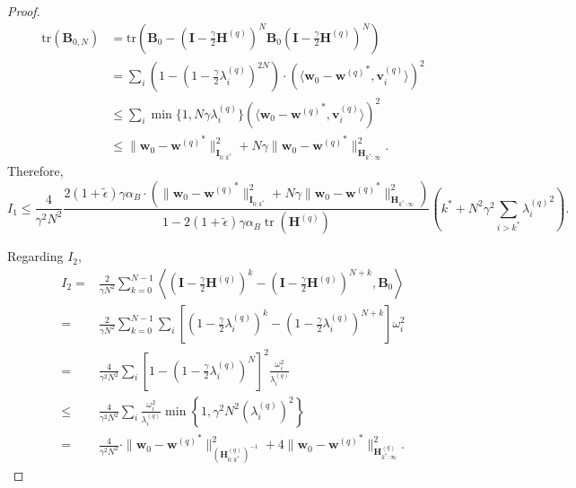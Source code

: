 \documentclass[11pt, letterpaper]{article}
\begin{document}
\begin{proof}
\begin{equation}
        \begin{aligned}
            \mathrm{tr}(\mathbf{B}_{0,N})&=\mathrm{tr}\left(\mathbf{B}_{0}-(\mathbf{I}-\frac{\gamma}{2}\mathbf{H}^{(q)})^{N}\mathbf{B}_{0}(\mathbf{I}-\frac{\gamma}{2}\mathbf{H}^{(q)})^{N}\right)\\
            &=\sum_{i}\left(1-(1-\frac{\gamma}{2}\lambda_{i}^{(q)})^{2N}\right)\cdot\left(\langle\mathbf{w}_{0}-{\mathbf{w}^{(q)}}^{*},\mathbf{v}_{i}^{(q)}\rangle\right)^{2}\\
            &\leq \sum_i\min\{1,N\gamma\lambda_i^{(q)}\}\left(\langle\mathbf{w}_0-{\mathbf{w}^{(q)}}^*,\mathbf{v}_i^{(q)}\rangle\right)^2\\
            &\leq \|\mathbf{w}_{0}-{\mathbf{w}^{(q)}}^{*}\|_{\mathbf{I}_{0:k^{*}}}^{2}+N\gamma\|\mathbf{w}_{0}-{\mathbf{w}^{(q)}}^{*}\|_{\mathbf{H}_{k^{*}:\infty}}^{2}.
        \end{aligned}
    \end{equation}
    Therefore,
    \begin{equation*}
        I_1\leq \frac{4}{\gamma^2N^2}\frac{2(1+\tilde{\epsilon})\gamma\alpha_B\cdot\left(\|\mathbf{w}_{0}-{\mathbf{w}^{(q)}}^{*}\|_{\mathbf{I}_{0:k^{*}}}^{2}+N\gamma\|\mathbf{w}_{0}-{\mathbf{w}^{(q)}}^{*}\|_{\mathbf{H}_{k^{*}:\infty}}^{2}\right)}{1-2(1+\tilde{\epsilon})\gamma\alpha_B\operatorname{tr}(\mathbf{H}^{(q)})}\left(k^* + {N^2\gamma^2}\sum_{i> k^*}{\lambda_i^{(q)}}^2\right).
    \end{equation*}

    Regarding $I_2$,
    \begin{equation*}
        \begin{aligned}
            I_2=&\frac{2}{\gamma N^{2}}\sum_{k=0}^{N-1}\left\langle(\mathbf{I}-\frac{\gamma}{2}\mathbf{H}^{(q)})^{k}-(\mathbf{I}-\frac{\gamma}{2}\mathbf{H}^{(q)})^{N+k},\mathbf{B}_{0}\right\rangle\\
            =&\frac{2}{\gamma N^{2}}\sum_{k=0}^{N-1}\sum_i\left[(1-\frac{\gamma}{2}\lambda_i^{(q)})^{k}-(1-\frac{\gamma}{2}\lambda_i^{(q)})^{N+k}\right]\omega_i^2\\
            =&\frac{4}{\gamma^2 N^{2}}\sum_i\left[1-(1-\frac{\gamma}{2}\lambda_i^{(q)})^{N}\right]^2\frac{\omega_i^2}{\lambda_i^{(q)}}\\
            \leq&\frac{4}{\gamma^2 N^{2}}\sum_i\frac{\omega_i^2}{\lambda_i^{(q)}}\operatorname*{min}\left\{1,\gamma^{2}N^{2}(\lambda_{i}^{(q)})^{2}\right\}\\
            =&\frac{4}{\gamma^2N^2}\cdot\|\mathbf{w}_0-{\mathbf{w}^{(q)}}^*\|_{(\mathbf{H}_{0:k^*}^{(q)})^{-1}}^2+4\|\mathbf{w}_0-{\mathbf{w}^{(q)}}^*\|_{\mathbf{H}_{{k^*}:\infty}^{(q)}}^2.
        \end{aligned}
    \end{equation*}


\end{proof}
\end{document}
